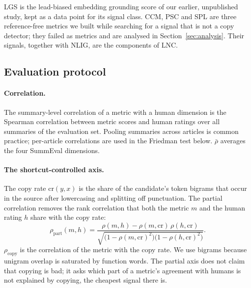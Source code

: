 LGS is the lead-biased embedding grounding score of our earlier, unpublished study, kept as a data point for its signal class. CCM, PSC and SPL are three reference-free metrics we built while searching for a signal that is not a copy detector; they failed as metrics and are analysed in Section~\ref{sec:analysis}. Their signals, together with NLIG, are the components of LNC.

\subsection{Evaluation protocol}

\paragraph{Correlation.} The summary-level correlation of a metric with a human dimension is the Spearman correlation between metric scores and human ratings over all summaries of the evaluation set. Pooling summaries across articles is common practice; per-article correlations are used in the Friedman test below. $\bar\rho$ averages the four SummEval dimensions.

\paragraph{The shortcut-controlled axis.} The copy rate $\mathrm{cr}(y,x)$ is the share of the candidate's token bigrams that occur in the source after lowercasing and splitting off punctuation. The partial correlation removes the rank correlation that both the metric $m$ and the human rating $h$ share with the copy rate:
\begin{equation}
\rho_{\mathrm{part}}(m,h) = \frac{\rho(m,h) - \rho(m,\mathrm{cr})\,\rho(h,\mathrm{cr})}{\sqrt{\bigl(1-\rho(m,\mathrm{cr})^2\bigr)\bigl(1-\rho(h,\mathrm{cr})^2\bigr)}}.
\end{equation}
$\rho_{\mathrm{copy}}$ is the correlation of the metric with the copy rate. We use bigrams because unigram overlap is saturated by function words. The partial axis does not claim that copying is bad; it asks which part of a metric's agreement with humans is not explained by copying, the cheapest signal there is.

